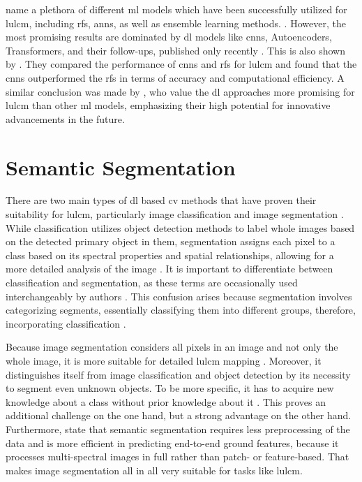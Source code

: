 \textcite{Rangel.Terven.ea2024,Basheer.Wang.ea2022} name a plethora of different \gls{ml} models which have been successfully utilized for \gls{lulcm}, including \glspl{rf}, \glspl{ann}, as well as ensemble learning methods. \autocite{Li.Cai.ea2024,Moharram.Sundaram2023,Rangel.Terven.ea2024}. However, the most promising results are dominated by \gls{dl} models like \glspl{cnn}, Autoencoders, Transformers, and their follow-ups, published only recently \autocite{Li.Cai.ea2024,Rangel.Terven.ea2024,Tzepkenlis.Marthoglou.ea2023}. This is also shown by \textcite{Boston.VanDijk.ea2022,Kussul.Lavreniuk.ea2017}. They compared the performance of \glspl{cnn} and \glspl{rf} for \gls{lulcm} and found that the \glspl{cnn} outperformed the \glspl{rf} in terms of accuracy and computational efficiency. A similar conclusion was made by \textcite{Digra.Dhir.ea2022,Moharram.Sundaram2023,Tzepkenlis.Marthoglou.ea2023}, who value the \gls{dl} approaches more promising for \gls{lulcm} than other \gls{ml} models, emphasizing their high potential for innovative advancements in the future.

\section{Semantic Segmentation}

There are two main types of \gls{dl} based \gls{cv} methods that have proven their suitability for \gls{lulcm}, particularly image classification and image segmentation \autocite{Boston.VanDijk.ea2022,Digra.Dhir.ea2022,Kussul.Lavreniuk.ea2017}. While classification utilizes object detection methods to label whole images based on the detected primary object in them, segmentation assigns each pixel to a class based on its spectral properties and spatial relationships, allowing for a more detailed analysis of the image \autocite{Alhassan.Henry.ea2020,Li.Cai.ea2024,Rangel.Terven.ea2024,Szeliski2022}. It is important to differentiate between classification and segmentation, as these terms are occasionally used interchangeably by authors \autocite{Cao.Zhu.ea2018,Onim.Ehtesham.ea2020}. This confusion arises because segmentation involves categorizing segments, essentially classifying them into different groups, therefore, incorporating classification \autocite{Alhassan.Henry.ea2020}.

Because image segmentation considers all pixels in an image and not only the whole image, it is more suitable for detailed \gls{lulcm} mapping \autocite{Li.Cai.ea2024}. Moreover, it distinguishes itself from image classification and object detection by its necessity to segment even unknown objects. To be more specific, it has to acquire new knowledge about a class without prior knowledge about it \autocite{Guo.Liu.ea2018}. This proves an additional challenge on the one hand, but a strong advantage on the other hand. Furthermore, \textcite{Chen.Liu.ea2023,Guo.Liu.ea2018} state that semantic segmentation requires less preprocessing of the data and is more efficient in predicting end-to-end ground features, because it processes multi-spectral images in full rather than patch- or feature-based. That makes image segmentation all in all very suitable for tasks like \gls{lulcm}.

